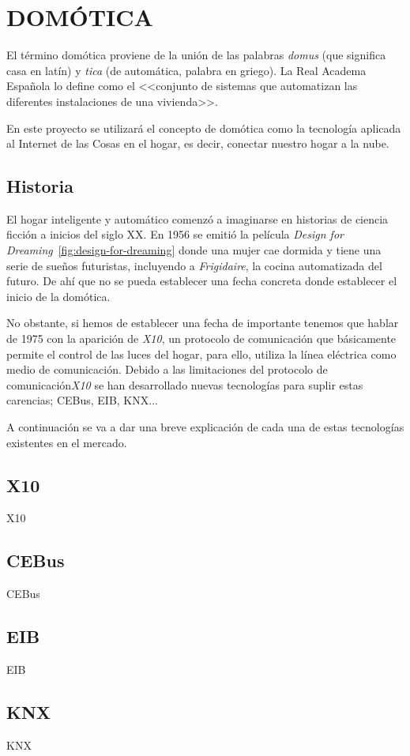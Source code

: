 \section{DOMÓTICA}

El término domótica proviene de la unión de las palabras \emph{domus} (que significa casa en latín) y \emph{tica} (de automática, palabra en griego). La Real Academa Española lo define como el <<conjunto de sistemas que automatizan las diferentes instalaciones de una vivienda>>.

En este proyecto se utilizará el concepto de domótica como la tecnología aplicada al Internet de las Cosas en el hogar, es decir, conectar nuestro hogar a la nube.

\subsection{Historia}


El hogar inteligente y automático comenzó a imaginarse en historias de ciencia ficción a inicios del siglo XX. En 1956 se emitió la película \emph{Design for Dreaming}~\ref{fig:design-for-dreaming} donde una mujer cae dormida y tiene una serie de sueños futuristas, incluyendo a \emph{Frigidaire}, la cocina automatizada del futuro. De ahí que no se pueda establecer una fecha concreta donde establecer el inicio de la domótica.

No obstante, si hemos de establecer una fecha de importante tenemos que hablar de 1975 con la aparición de \emph{X10}, un protocolo de comunicación que básicamente permite el control de las luces del hogar, para ello, utiliza la línea eléctrica como medio de comunicación. Debido a las limitaciones del protocolo de comunicación\emph{X10} se han desarrollado nuevas tecnologías para suplir estas carencias; CEBus, EIB, KNX...

A continuación se va a dar una breve explicación de cada una de estas tecnologías existentes en el mercado.

\subsection{X10}

X10

\subsection{CEBus}

CEBus

\subsection{EIB}

EIB

\subsection{KNX}

KNX
